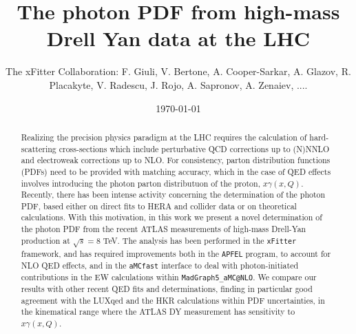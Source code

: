\documentclass[english,aps]{revtex4-1}
\begin{document}
\linenumbers

\title{The photon PDF from high-mass Drell Yan data at the LHC}

\author{The xFitter Collaboration: F. Giuli, V. Bertone, A. Cooper-Sarkar, A. Glazov, R. Placakyte, V. Radescu,  J. Rojo, A. Sapronov, A. Zenaiev, .... }

\date{\today}
\begin{abstract}
  Realizing the precision physics paradigm at the LHC requires the calculation
   of  hard-scattering
   cross-sections which include perturbative QCD corrections up to (N)NNLO
   and electroweak corrections up to NLO.
   For consistency, parton distribution functions (PDFs) need to be provided
   with matching accuracy, which in the case of QED effects involves introducing
   the photon parton distributuon of the proton, $x\gamma(x,Q)$.
   Recently, there has been intense activity concerning the determination
   of the photon PDF, based either on direct fits to HERA
   and collider data or  on theoretical calculations.
   With this motivation, in
   this work we present a novel determination of the photon PDF from the recent ATLAS measurements
  of high-mass Drell-Yan production at $\sqrt{s}=8$ TeV.
  The analysis has been performed in the {\tt xFitter} framework, and has required
  improvements both in the {\tt APFEL} program, to account for NLO QED effects,
  and in the {\tt aMCfast} interface to deal with photon-initiated contributions
  in the EW calculations within {\tt MadGraph5\_aMC@NLO}.
  We compare our results with other recent QED fits
  and determinations, finding in particular
  good agreement with the LUXqed and the HKR calculations within PDF uncertainties,
  in the kinematical range where the ATLAS DY measurement has sensitivity to
  $x\gamma(x,Q)$.
\end{abstract}
\maketitle
\tableofcontents{}












\end{document}
